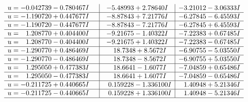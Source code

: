 \documentclass[1p]{elsarticle_modified}
\theoremstyle{definition}
\begin{document}
$$\begin{array}{c|c|c}
\begin{aligned}
u &= -0.042739 - 0.780467 I\end{aligned}
 & -5.48993 + 2.78640 I & -3.21012 - 3.06333 I \\ \hline\begin{aligned}
u &= -1.190720 + 0.447677 I\end{aligned}
 & -8.87843 + 7.21776 I & -6.27845 - 6.45593 I \\ \hline\begin{aligned}
u &= -1.190720 - 0.447677 I\end{aligned}
 & -8.87843 - 7.21776 I & -6.27845 + 6.45593 I \\ \hline\begin{aligned}
u &= \phantom{-}1.208770 + 0.404400 I\end{aligned}
 & -9.21675 - 1.40322 I & -7.22383 + 0.67485 I \\ \hline\begin{aligned}
u &= \phantom{-}1.208770 - 0.404400 I\end{aligned}
 & -9.21675 + 1.40322 I & -7.22383 - 0.67485 I \\ \hline\begin{aligned}
u &= -1.290770 + 0.486469 I\end{aligned}
 & \phantom{-}18.7348 + 8.5672 I & -6.90755 - 5.03550 I \\ \hline\begin{aligned}
u &= -1.290770 - 0.486469 I\end{aligned}
 & \phantom{-}18.7348 - 8.5672 I & -6.90755 + 5.03550 I \\ \hline\begin{aligned}
u &= \phantom{-}1.295050 + 0.477383 I\end{aligned}
 & \phantom{-}18.6641 - 1.6077 I & -7.04859 + 0.65486 I \\ \hline\begin{aligned}
u &= \phantom{-}1.295050 - 0.477383 I\end{aligned}
 & \phantom{-}18.6641 + 1.6077 I & -7.04859 - 0.65486 I \\ \hline\begin{aligned}
u &= -0.211725 + 0.440665 I\end{aligned}
 & \phantom{-}0.159228 - 1.336100 I & \phantom{-}1.40948 + 5.21346 I \\ \hline\begin{aligned}
u &= -0.211725 - 0.440665 I\end{aligned}
 & \phantom{-}0.159228 + 1.336100 I & \phantom{-}1.40948 - 5.21346 I\\
 \hline 
 \end{array}$$\newpage
\end{document}

